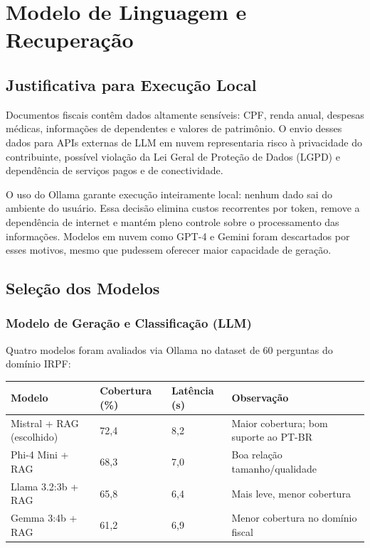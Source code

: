 \documentclass[11pt,a4paper,oneside]{article}
\begin{document}
\section{Modelo de Linguagem e Recuperação}

\subsection{Justificativa para Execução Local}

Documentos fiscais contêm dados altamente sensíveis: CPF, renda anual, despesas médicas, informações de dependentes e valores de patrimônio. O envio desses dados para APIs externas de LLM em nuvem representaria risco à privacidade do contribuinte, possível violação da Lei Geral de Proteção de Dados (LGPD) e dependência de serviços pagos e de conectividade.

O uso do Ollama garante execução inteiramente local: nenhum dado sai do ambiente do usuário. Essa decisão elimina custos recorrentes por token, remove a dependência de internet e mantém pleno controle sobre o processamento das informações. Modelos em nuvem como GPT-4 e Gemini foram descartados por esses motivos, mesmo que pudessem oferecer maior capacidade de geração.

\subsection{Seleção dos Modelos}

\subsubsection*{Modelo de Geração e Classificação (LLM)}

Quatro modelos foram avaliados via Ollama no dataset de 60 perguntas do domínio IRPF:

\begin{center}
\begin{tabularx}{\textwidth}{@{}L{54mm}L{30mm}L{26mm}Y@{}}
\toprule
\textbf{Modelo} & \textbf{Cobertura (\%)} & \textbf{Latência (s)} & \textbf{Observação} \\
\midrule
Mistral + RAG (escolhido) & 72,4 & 8,2 & Maior cobertura; bom suporte ao PT-BR \\
Phi-4 Mini + RAG          & 68,3 & 7,0 & Boa relação tamanho/qualidade \\
Llama 3.2:3b + RAG        & 65,8 & 6,4 & Mais leve, menor cobertura \\
Gemma 3:4b + RAG          & 61,2 & 6,9 & Menor cobertura no domínio fiscal \\
\bottomrule
\end{tabularx}
\end{center}
\end{document}
